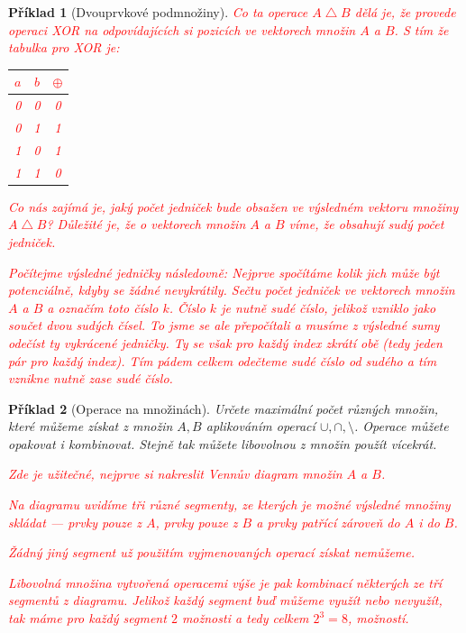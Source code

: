 \documentclass[10pt]{article}
\theoremstyle{definitionstyle}
\theoremstyle{problemstyle}
\newtheorem{problem}{Příklad}
\begin{document}
\begin{problem}[Dvouprvkové podmnožiny]
\textcolor{red}{Co ta operace $A \bigtriangleup B$ dělá je, že provede operaci XOR na odpovídajících si pozicích ve vektorech množin $A$ a $B$. S tím že tabulka pro XOR je:}

\textcolor{red}{
\begin{tabular}{|c|c|c|}
\hline
$a$ & $b$ & $\oplus$ \\
\hline
0 & 0 & 0 \\
0 & 1 & 1 \\
1 & 0 & 1 \\
1 & 1 & 0 \\
\hline
\end{tabular}
}

\textcolor{red}{Co nás zajímá je, jaký počet jedniček bude obsažen ve výsledném vektoru množiny $A \bigtriangleup B$? Důležité je, že o vektorech množin $A$ a $B$ víme, že obsahují sudý počet jedniček.}

\textcolor{red}{Počítejme výsledné jedničky následovně: Nejprve spočítáme kolik jich může být potenciálně, kdyby se žádné nevykrátily. Sečtu počet jedniček ve vektorech množin $A$ a $B$ a označím toto číslo $k$. Číslo $k$ je nutně sudé číslo, jelikož vzniklo jako součet dvou sudých čísel. To jsme se ale přepočítali a musíme z výsledné sumy odečíst ty vykrácené jedničky. Ty se však pro každý index zkrátí obě (tedy jeden pár pro každý index). Tím pádem celkem odečteme sudé číslo od sudého a tím vznikne nutně zase sudé číslo.}

\end{problem}

\begin{problem}[Operace na množinách]
Určete maximální počet různých množin, které můžeme získat z množin $A,B$ aplikováním operací $\cup, \cap, \setminus$. Operace můžete opakovat i kombinovat. Stejně tak můžete libovolnou z množin použít vícekrát.

\textcolor{red}{Zde je užitečné, nejprve si nakreslit Vennův diagram množin $A$ a $B$.}

\textcolor{red}{Na diagramu uvidíme tři různé segmenty, ze kterých je možné výsledné množiny skládat — prvky pouze z $A$, prvky pouze z $B$ a prvky patřící zároveň do $A$ i do $B$.}

\textcolor{red}{Žádný jiný segment už použitím vyjmenovaných operací získat nemůžeme.}

\textcolor{red}{Libovolná množina vytvořená operacemi výše je pak kombinací některých ze tří segmentů z diagramu. Jelikož každý segment buď můžeme využít nebo nevyužít, tak máme pro každý segment $2$ možnosti a tedy celkem $2^3 = 8$, možností.}

\end{problem}
\end{document}
